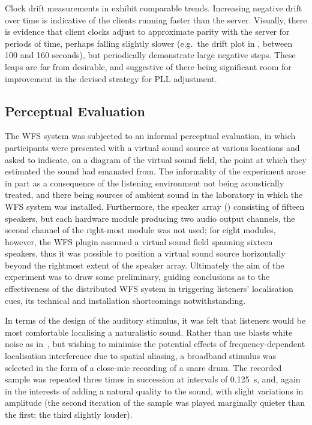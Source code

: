 Clock drift measurements in  exhibit
comparable trends.
Increasing negative drift over time is indicative of the clients running faster
than the server.
Visually, there is evidence that client clocks adjust to approximate parity
with the server for periods of time, perhaps falling slightly slower (e.g.\
the drift plot in , between 100 and 160 seconds), but
periodically demonstrate large negative steps.
These leaps are far from desirable, and suggestive of there being significant
room for improvement in the devised strategy for PLL adjustment.


\subsection{Perceptual Evaluation}\label{subsec:perceptual-evaluation}

The WFS system was subjected to an informal perceptual evaluation, in which
participants were presented with a virtual sound source at various locations
and asked to indicate, on a diagram of the virtual sound field, the point
at which they estimated the sound had emanated from.
The informality of the experiment arose in part as a consequence of the
listening environment not being acoustically treated, and there being sources
of ambient sound in the laboratory in which the WFS system was installed.
Furthermore, the speaker array (\figref{fig:eval-setup}) consisting of fifteen
speakers, but each hardware module producing two audio output channels,
the second channel of the right-most module was not used;
for eight modules, however, the WFS plugin assumed a virtual sound field
spanning sixteen speakers, thus it was possible to position a virtual sound
source horizontally beyond the rightmost extent of the speaker array.
Ultimately the aim of the experiment was to draw some preliminary, guiding
conclusions as to the effectiveness of the distributed WFS system in
triggering listeners' localisation cues, its technical and installation
shortcomings notwithstanding.

In terms of the design of the auditory stimulus, it was felt that listeners
would be most comfortable localising a naturalistic sound.
Rather than use blasts white noise as in~\citep[ch.~6]{verheijen_sound_1998},
but wishing to minimise the potential effects of frequency-dependent
localisation interference due to spatial aliasing, a broadband stimulus
was selected in the form of a close-mic recording of a snare drum.
The recorded sample was repeated three times in succession at intervals of
\qty{.125}{\s}, and, again in the interests of adding a natural quality to the
sound, with slight variations in amplitude (the second iteration of the sample
was played marginally quieter than the first; the third slightly louder).

